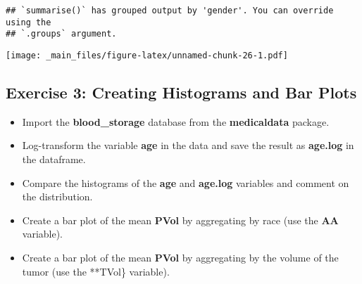 \documentclass[
]{book}
\providecommand{\tightlist}{%
  \setlength{\itemsep}{0pt}\setlength{\parskip}{0pt}}
\begin{document}
\begin{verbatim}
## `summarise()` has grouped output by 'gender'. You can override using the
## `.groups` argument.
\end{verbatim}

\texttt{[image: \_main\_files/figure-latex/unnamed-chunk-26-1.pdf]}

\subsection{Exercise 3: Creating Histograms and Bar Plots}\label{exercise-3-creating-histograms-and-bar-plots}

\begin{itemize}
\tightlist
\item
  Import the \textbf{blood\_storage} database from the \textbf{medicaldata} package.
\item
  Log-transform the variable \textbf{age} in the data and save the result as \textbf{age.log} in the dataframe.
\item
  Compare the histograms of the \textbf{age} and \textbf{age.log} variables and comment on the distribution.
\item
  Create a bar plot of the mean \textbf{PVol} by aggregating by race (use the \textbf{AA} variable).
\item
  Create a bar plot of the mean \textbf{PVol} by aggregating by the volume of the tumor (use the **TVol\} variable).
\end{itemize}

  
\end{document}
